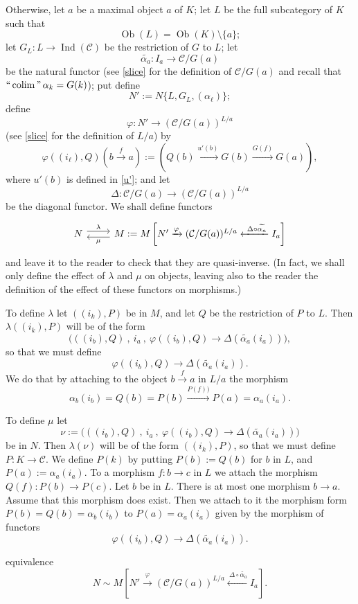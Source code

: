 \documentclass[12pt]{article}
\theoremstyle{remark}
\theoremstyle{definition}
\newcommand{\C}{\mathcal C}
\newcommand{\pp}{\varphi}
\newcommand{\xr}{\xrightarrow}
\DeclareMathOperator*{\coli}{colim}
\DeclareMathOperator*{\ic}{``\coli"}
\DeclareMathOperator{\Ind}{Ind}
\DeclareMathOperator{\Ob}{Ob}
\begin{document}
Otherwise, let $a$ be a maximal object $a$ of $K$; let $L$ be the full subcategory of $K$ such that 
$$
\Ob(L)=\Ob(K)\setminus\{a\};
$$ 
let $G_L:L\to\Ind(\C)$ be the restriction of $G$ to $L$; let 
$$
\widetilde{\alpha_a}:I_a\to\C/G(a)
$$ 
be the natural functor (see \eqref{slice} for the definition of $\C/G(a)$ and recall that $\ic\alpha_k=G(k)$); put define 
$$
N':=N\{L,G_L,(\alpha_\ell)\};
$$
define 
$$ 
\varphi:N'\to(\C/G(a))^{L/a} 
$$ 
(see \eqref{slice} for the definition of $L/a$) by 
$$
\varphi((i_\ell),Q)\left(b\xr f a\right):=\left(Q(b)\xr{u'(b)} G(b)\xr{G(f)}G(a)\right),
$$
where $u'(b)$ is defined in \eqref{u'}; and let 
$$
\Delta:\C/G(a)\to(\C/G(a))^{L/a}
$$ 
be the diagonal functor. We shall define functors 
$$
\begin{tikzcd}
N\ar[yshift=0.7ex]{r}{\lambda}&M:=M\left[N'\xrightarrow{\varphi}(\C/G(a))^{L/a}\xleftarrow{\ \Delta\circ\widetilde{\alpha_a}}I_a\right]\ar[yshift=-0.7ex]{l}{\mu}
\end{tikzcd}
$$ 
and leave it to the reader to check that they are quasi-inverse. (In fact, we shall only define the effect of $\lambda$ and $\mu$ on objects, leaving also to the reader the definition of the effect of these functors on morphisms.)

To define $\lambda$ let $((i_k),P)$ be in $M$, and let $Q$ be the restriction of $P$ to $L$. Then $\lambda((i_k),P)$ will be of the form 
$$
\Big(((i_b),Q)\ ,\ i_a\ ,\ \pp((i_b),Q)\to\Delta(\widetilde{\alpha_a}(i_a))\Big),
$$ 
so that we must define 
$$
\pp((i_b),Q)\to\Delta(\widetilde{\alpha_a}(i_a)).
$$ 
We do that by attaching to the object $b\xr f a$ in $L/a$ the morphism 
$$
\alpha_b(i_b)=Q(b)=P(b)\xr{P(f))}P(a)=\alpha_a(i_a).
$$

To define $\mu$ let 
$$
\nu:=\Big(((i_b),Q)\ ,\ i_a\ ,\ \pp((i_b),Q)\to\Delta(\widetilde{\alpha_a}(i_a))\Big)
$$ 
be in $N$. Then $\lambda(\nu)$ will be of the form $((i_k),P)$, so that we must define $P:K\to\C$. We define $P(k)$ by putting $P(b):=Q(b)$ for $b$ in $L$, and $P(a):=\alpha_a(i_a)$. To a morphism $f:b\to c$ in $L$ we attach the morphism $Q(f):P(b)\to P(c)$. Let $b$ be in $L$. There is at most one morphism $b\to a$. Assume that this morphism does exist. Then we attach to it the morphism form $P(b)=Q(b)=\alpha_b(i_b)$ to $P(a)=\alpha_a(i_a)$ given by the morphism of functors 
$$
\pp((i_b),Q)\to\Delta(\widetilde{\alpha_a}(i_a)).
$$



equivalence 
$$ 
N\sim M\left[N'\xrightarrow{\varphi}(\C/G(a))^{L/a}\xleftarrow{\ \Delta\circ\widetilde{\alpha_a}}I_a\right]. 
$$
\end{document}
